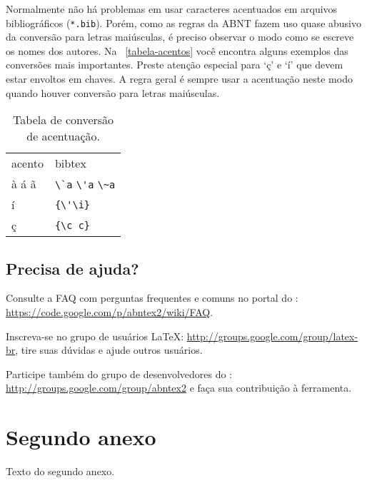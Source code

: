 \documentclass[12pt,oneside,a4paper,chapter=TITLE,
			   english,brazil]{abntex2}
\begin{document}
\begin{anexosenv}
Normalmente não há problemas em usar caracteres acentuados em arquivos bibliográficos (\texttt{*.bib}). Porém, como as regras da ABNT fazem uso quase abusivo da conversão para letras maiúsculas, é preciso observar o modo como se escreve os nomes dos autores. Na ~\autoref{tabela-acentos} você encontra alguns exemplos das conversões mais importantes. Preste atenção especial para `ç' e `í' que devem estar envoltos em chaves. A regra geral é sempre usar a acentuação neste modo quando houver conversão para letras maiúsculas.
\begin{table}[htbp]
\caption{Tabela de conversão de acentuação.}
\label{tabela-acentos}
\begin{center}
\begin{tabular}{ll}\hline\hline
acento & \textsf{bibtex}\\
à á ã & \verb+\`a+ \verb+\'a+ \verb+\~a+\\
í & \verb+{\'\i}+\\
ç & \verb+{\c c}+\\
\hline\hline
\end{tabular}
\end{center}
\end{table}


\section{Precisa de ajuda?}

Consulte a FAQ com perguntas frequentes e comuns no portal do \abnTeX: \url{https://code.google.com/p/abntex2/wiki/FAQ}.

Inscreva-se no grupo de usuários \LaTeX: \url{http://groups.google.com/group/latex-br}, tire suas dúvidas e ajude outros usuários.

Participe também do grupo de desenvolvedores do \abnTeX: \url{http://groups.google.com/group/abntex2} e faça sua contribuição à ferramenta.


\chapter{Segundo anexo}

Texto do segundo anexo.

\end{anexosenv}


\printindex
\end{document}
